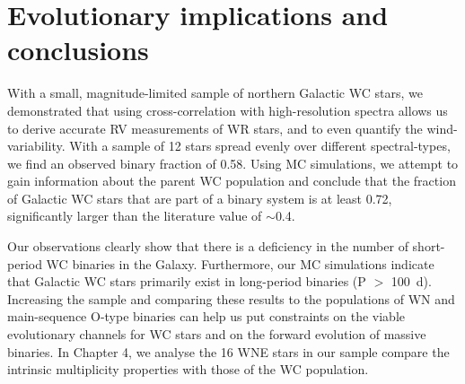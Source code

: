 \section{Evolutionary implications and conclusions}\label{sect:conclusions}
With a small, magnitude-limited sample of northern Galactic WC stars, we demonstrated that using cross-correlation with high-resolution spectra allows us to derive accurate RV measurements of WR stars, and to even quantify the wind-variability. With a sample of 12 stars spread evenly over different spectral-types, we find an observed binary fraction of 0.58. Using MC simulations, we attempt to gain information about the parent WC population and conclude that the fraction of Galactic WC stars that are part of a binary system is at least 0.72, significantly larger than the literature value of ${\sim}$0.4.

Our observations clearly show that there is a deficiency in the number of short-period WC binaries in the Galaxy. Furthermore, our MC simulations indicate that Galactic WC stars primarily exist in long-period binaries (P $>$ 100~d). Increasing the sample and comparing these results to the populations of WN and main-sequence O-type binaries can help us put constraints on the viable evolutionary channels for WC stars and on the forward evolution of massive binaries. In Chapter 4, we analyse the 16 WNE stars in our sample compare the intrinsic multiplicity properties with those of the WC population.



